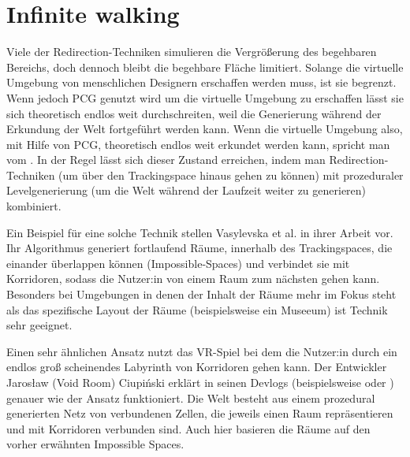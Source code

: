 \section{Infinite walking}
Viele der Redirection-Techniken simulieren die Vergrößerung des begehbaren Bereichs, doch dennoch bleibt die begehbare Fläche limitiert. Solange die virtuelle Umgebung von menschlichen Designern erschaffen werden muss, ist sie begrenzt. Wenn jedoch PCG genutzt wird um die virtuelle Umgebung zu erschaffen lässt sie sich theoretisch endlos weit durchschreiten, weil die Generierung während der Erkundung der Welt fortgeführt werden kann.
Wenn die virtuelle Umgebung also, mit Hilfe von PCG, theoretisch endlos weit erkundet werden kann, spricht man vom .
In der Regel lässt sich dieser Zustand %
erreichen, indem man Redirection-Techniken (um über den Trackingspace hinaus gehen zu können) mit prozeduraler Levelgenerierung (um die Welt während der Laufzeit weiter zu generieren) kombiniert.

Ein Beispiel für eine solche Technik stellen Vasylevska et al. in ihrer Arbeit \cite{flexible-spaces} vor. Ihr Algorithmus generiert fortlaufend Räume, innerhalb des Trackingspaces, die einander überlappen können (Impossible-Spaces) und verbindet sie mit Korridoren, sodass die Nutzer:in von einem Raum zum nächsten gehen kann.
Besonders bei Umgebungen in denen der Inhalt der Räume mehr im Fokus steht als das spezifische Layout der Räume (beispielsweise ein Museeum) ist Technik sehr geeignet.

Einen sehr ähnlichen Ansatz nutzt das VR-Spiel  \cite{tea-for-god} bei dem die Nutzer:in durch ein endlos groß scheinendes Labyrinth von Korridoren gehen kann. Der Entwickler Jarosław (Void Room) Ciupiński erklärt in seinen Devlogs (beispielsweise \cite{tea-for-god-devlog-a} oder \cite{tea-for-god-devlog-b}) genauer wie der Ansatz funktioniert.
Die Welt besteht aus einem prozedural generierten Netz von verbundenen Zellen, die jeweils einen Raum repräsentieren und mit Korridoren verbunden sind. Auch hier basieren die Räume auf den vorher erwähnten Impossible Spaces.

